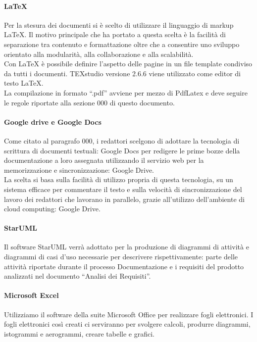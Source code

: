 			\paragraph{LaTeX}
				Per la stesura dei documenti si è scelto di utilizzare il linguaggio di markup LaTeX. Il motivo principale che ha portato a questa scelta è la facilità di separazione tra contenuto e formattazione oltre che a consentire uno sviluppo orientato alla modularità, alla collaborazione e alla scalabilità.\\
				Con LaTeX è possibile definire l’aspetto delle pagine in un file template condiviso da tutti i documenti. TEXstudio versione 2.6.6 viene utilizzato come editor di testo LaTeX.  \\
				La compilazione in formato “.pdf” avviene per mezzo di PdfLatex e deve seguire le regole riportate alla sezione 000 di questo documento.
			\paragraph{Google drive e Google Docs}
				Come citato al paragrafo 000, i redattori scelgono di adottare la tecnologia di scrittura di documenti testuali: Google Docs per redigere le prime bozze della documentazione a loro assegnata utilizzando il servizio web per la memorizzazione e sincronizzazione: Google Drive. \\
				La scelta si basa sulla facilità di utilizzo propria di questa tecnologia, su un sistema efficace per commentare il testo e sulla velocità di sincronizzazione del lavoro dei redattori che lavorano in parallelo, grazie all’utilizzo dell’ambiente di cloud computing: Google Drive. \\
			\paragraph{StarUML}
				Il software StarUML verrà adottato per la produzione di diagrammi di attività e diagrammi di casi d’uso necessarie per descrivere rispettivamente: parte delle attività riportate durante il processo Documentazione e i requisiti del prodotto analizzati nel documento “Analisi dei Requisiti”.
			\paragraph{Microsoft Excel}
				Utilizziamo il software della suite Microsoft Office per realizzare fogli elettronici. I fogli elettronici così creati ci serviranno per svolgere calcoli, produrre diagrammi, istogrammi e aerogrammi, creare tabelle e grafici.

